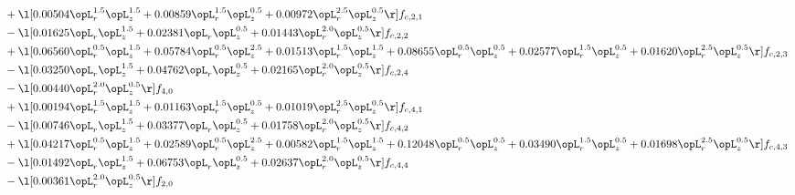 \begin{alignat}{2}
& + \l[  0.00504 \opL_r^{1.5} \opL_z^{1.5} +  0.00859 \opL_r^{1.5} \opL_z^{0.5} +  0.00972 \opL_r^{2.5} \opL_z^{0.5}  \r] f_{c,2,1} \nonumber \\ 
& - \l[  0.01625 \opL_r \opL_z^{1.5} +  0.02381 \opL_r \opL_z^{0.5} +  0.01443 \opL_r^{2.0} \opL_z^{0.5}  \r] f_{c,2,2} \nonumber \\ 
& + \l[  0.06560 \opL_r^{0.5} \opL_z^{1.5} +  0.05784 \opL_r^{0.5} \opL_z^{2.5} +  0.01513 \opL_r^{1.5} \opL_z^{1.5} +  0.08655 \opL_r^{0.5} \opL_z^{0.5} +  0.02577 \opL_r^{1.5} \opL_z^{0.5} +  0.01620 \opL_r^{2.5} \opL_z^{0.5}  \r] f_{c,2,3} \nonumber \\ 
& - \l[  0.03250 \opL_r \opL_z^{1.5} +  0.04762 \opL_r \opL_z^{0.5} +  0.02165 \opL_r^{2.0} \opL_z^{0.5}  \r] f_{c,2,4} \nonumber \\ 
& - \l[  0.00440 \opL_r^{2.0} \opL_z^{0.5}  \r] f_{4,0} \nonumber \\ 
& + \l[  0.00194 \opL_r^{1.5} \opL_z^{1.5} +  0.01163 \opL_r^{1.5} \opL_z^{0.5} +  0.01019 \opL_r^{2.5} \opL_z^{0.5}  \r] f_{c,4,1} \nonumber \\ 
& - \l[  0.00746 \opL_r \opL_z^{1.5} +  0.03377 \opL_r \opL_z^{0.5} +  0.01758 \opL_r^{2.0} \opL_z^{0.5}  \r] f_{c,4,2} \nonumber \\ 
& + \l[  0.04217 \opL_r^{0.5} \opL_z^{1.5} +  0.02589 \opL_r^{0.5} \opL_z^{2.5} +  0.00582 \opL_r^{1.5} \opL_z^{1.5} +  0.12048 \opL_r^{0.5} \opL_z^{0.5} +  0.03490 \opL_r^{1.5} \opL_z^{0.5} +  0.01698 \opL_r^{2.5} \opL_z^{0.5}  \r] f_{c,4,3} \nonumber \\ 
& - \l[  0.01492 \opL_r \opL_z^{1.5} +  0.06753 \opL_r \opL_z^{0.5} +  0.02637 \opL_r^{2.0} \opL_z^{0.5}  \r] f_{c,4,4} \nonumber \\ 
& - \l[  0.00361 \opL_r^{2.0} \opL_z^{0.5}  \r] f_{2,0} \nonumber \\ 
\end{alignat} 


